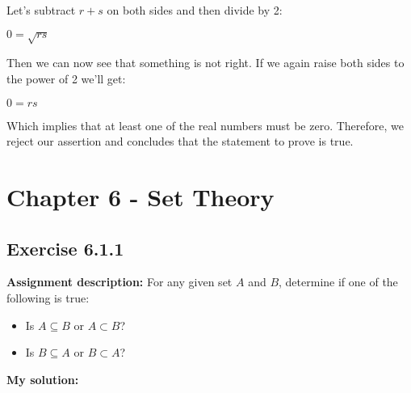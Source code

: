 \documentclass{article}
\newcommand{\cent}[1]{\begin{center}#1\end{center}}
\newcommand{\Assign}{\textbf{Assignment description: }}
\newcommand{\Solution}{\textbf{My solution: }}
\newcommand{\QED}{\boxed{}}
\newcommand{\Exercise}[1]{\subsection{Exercise #1}}
\begin{document}
	Let's subtract $r+s$ on both sides and then divide by 2:
	
	\cent{$0 = \sqrt{rs}$}
	
	Then we can now see that something is not right. If we again raise both sides to the power of 2 we'll get:
	
	\cent{$0 = rs$}
	
	Which implies that at least one of the real numbers must be zero. Therefore, we reject our assertion and concludes that the statement to prove is true.\\
	\QED
	
	\section{Chapter 6 - Set Theory}
	
	\Exercise{6.1.1}
	
	\Assign
	For any given set $A$ and $B$, determine if one of the following is true:
	\begin{itemize}
		\item Is $A \subseteq B $ or $A \subset B$?
		\item Is $B \subseteq A$ or $B \subset A$?
	\end{itemize}

	\Solution
	
\end{document}

